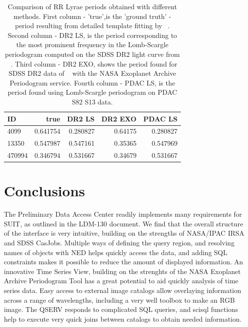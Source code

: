 \documentclass[DM,lsstdraft,toc,usenatbib]{lsstdoc}
\begin{document}
\begin{table}
\centering
\caption{Comparison of RR Lyrae periods obtained with different methods. First column - 'true',is the 'ground truth' -  period resulting from detailed template fitting by ~\citep{sesar2010}. Second column - DR2 LS, is the period corresponding to the most prominent frequency in the Lomb-Scargle periodogram  computed on the SDSS DR2 light curve from ~\citep{sesar2010}. Third column - DR2 EXO, shows the period found for SDSS DR2 data of  ~\citep{sesar2010}  with the NASA Exoplanet Archive Periodogram service.  Fourth column - PDAC LS, is the period found using Lomb-Scargle periodogram  on PDAC S82 S13 data.}
\label{tab:periods}
\begin{tabular}{ l|rrrr } 
\hline
 ID      & true        & DR2 LS      & DR2 EXO      &  PDAC LS  \\ 
\hline
 4099    & 0.641754     & 0.280827   & 0.64175      &  0.280827 \\ 
 13350   & 0.547987     & 0.547161   & 0.35365      &  0.547969  \\ 
 470994  & 0.346794     & 0.531667   & 0.34679      &  0.531667  \\ 
\end{tabular}
\end{table}







\section{Conclusions}

The Preliminary Data Access Center readily implements  many requirements for SUIT, as outlined in the LDM-130 document. We find that the overall structure of the interface is very intuitive, building on the strengths of NASA/IPAC IRSA and SDSS CasJobs. Multiple ways of defining the query region, and resolving names of objects with NED helps quickly access the data, and adding SQL constraints makes it possible to reduce the amount of displayed information.  An innovative Time Series View,  building on the strenghts of the NASA Exoplanet Archive Periodogram Tool  has a great potential to aid quickly analysis of time series data.  Easy access to external image catalogs allow overlaying information across a range of wavelengths, including a very well toolbox to make an RGB image. The QSERV responds to complicated SQL queries, and scisql  functions help to execute very quick joins between catalogs to obtain needed information. 
\end{document}
